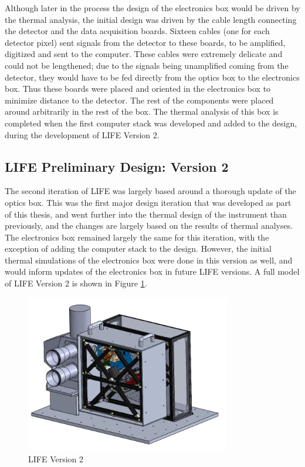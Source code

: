 Although later in the process the design of the electronics box would be driven by the thermal analysis, the initial design was driven by the cable length connecting the detector and the data acquisition boards. Sixteen cables (one for each detector pixel) sent signals from the detector to these boards, to be amplified, digitized and sent to the computer. These cables were extremely delicate and could not be lengthened; due to the signals being unamplified coming from the detector, they would have to be fed directly from the optics box to the electronics box. Thus these boards were placed and oriented in the electronics box to minimize distance to the detector. The rest of the components were placed around arbitrarily in the rest of the box. The thermal analysis of this box is completed when the first computer stack was developed and added to the design, during the development of LIFE Version 2.

\subsection{LIFE Preliminary Design: Version 2}
The second iteration of LIFE was largely based around a thorough update of the optics box. This was the first major design iteration that was developed as part of this thesis, and went further into the thermal design of the instrument than previously, and the changes are largely based on the results of thermal analyses. The electronics box remained largely the same for this iteration, with the exception of adding the computer stack to the design. However, the initial thermal simulations of the electronics box were done in this version as well, and would inform updates of the electronics box in future LIFE versions. A full model of LIFE Version 2 is shown in Figure \ref{fig:LIFE_V2}.

\begin{figure} %
    \centering
    \includegraphics[width=0.8\textwidth]{chap3_images/LIFE_V2_images/LIFE_V2.png}
    \caption{LIFE Version 2}
    \label{fig:LIFE_V2}
\end{figure}

